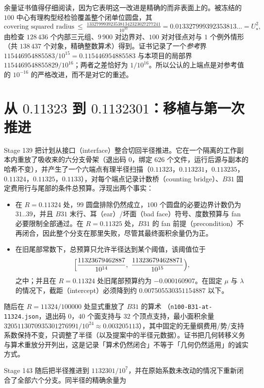 余量证书值得仔细阅读，因为它表明这一改进是精确的而非表面上的。被冻结的 $100$ 中心有理构型经检验覆盖整个闭单位圆盘，其
\[
\text{covering squared radius}\ \le\
\tfrac{1332799939235381342323027277241}{10^{33}}
=0.013327999392353813\ldots=U_\star^2 ,
\]
由检查 $128\,436$ 个内部三元组、$9\,900$ 对边界对、$100$ 对对径点对与 $1$ 个例外情形（共 $138\,437$ 个对象，精确整数算术）得到。证书记录了一个\emph{参考}界 $115446954885583/10^{15}=0.115446954885583$ 与本项目的局部界 $1154469548855829/10^{16}$；两者之差恰好为 $1/10^{16}$。所以公认的上端点是对参考值的 $10^{-16}$ 的严格改进，而不是对它的重述。

\section{从 $0.11323$ 到 $0.1132301$：移植与第一次推进}

Stage 139 把计划从接口（interface）整合切回半径推进。它在一个隔离的工作副本内重放了吸收来的六分支骨架（退出码 $0$，绑定 $626$ 个文件，运行后源与副本的哈希不变），并产生了一个六端点有理半径扫描（$0.11323$，$0.113231$，$0.113235$，$0.11324$，$0.11325$，$0.1133$），对每个端点记录计数桥（counting bridge）、$B31$ 固定费用行与尾部的条件总预算。浮现出两个事实：

\begin{itemize}[leftmargin=1.4em,itemsep=2pt]
\item 在 $R=0.11324$ 处，$99$ 圆盘排除仍然成立，$100$ 个圆盘的必要边界计数仍为 $31..39$，并且 $B31$ 末行、耳（ear）/坏面（bad face）符号、度数预算与 fan 必要限制全部通过。在 $R=0.11325$ 处，$B31$ 的 fan 前提（precondition）不再闭合，因此整个分支在那里失败，尽管其最终面积余量仍为正。
\item 在旧尾部常数下，总预算只允许半径达到某个阈值，该阈值位于
\[
\Bigl[\frac{11323679462887}{10^{14}},\ \frac{113236794628871}{10^{15}}\Bigr),
\]
之中；并且在 $R=0.11324$ 处旧尾部预算约为 $-0.000160907$。在固定 $\mu$ 与 $\lambda$ 的情况下，截距（intercept）必须降到约 $0.007505530351154887$ 以下。
\end{itemize}

随后在 $R=11324/100000$ 处显式重放了 $B31$ 的算术
（\texttt{n100-\allowbreak{}B31-\allowbreak{}at-\allowbreak{}11324.json}，退出码 $0$，$40$ 个面支持与 $32$ 个顶点支持，最小面积余量 $3205113070935301276991/10^{24}\approx0.003205113$），其中固定的无量纲费用/势/支持系数保持不变，只调整了半径（以及提案中的半径元数据）。证书把几何转移义务与算术重放分开列出，这是记录「算术仍然闭合」不等于「几何仍然适用」的诚实方式。

Stage 143 随后把半径推进到 $1132301/10^{7}$，并在原始系数未改动的情况下重新闭合了全部六个分支。同半径的精确余量为

